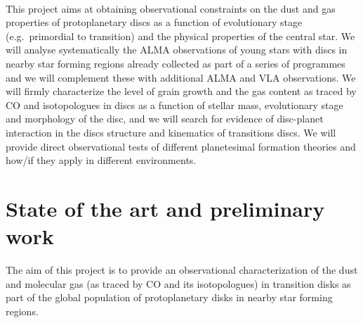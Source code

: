 \documentclass[10pt,fleqn,twoside]{article}
\begin{document}
\vspace{1em}
\\
This project aims at obtaining observational constraints on the dust and gas 
properties of protoplanetary discs as a function of evolutionary stage (e.g.\ primordial to transition) and 
the physical properties of the central star. We will analyse systematically
the ALMA observations of young stars with discs in nearby star forming regions already collected as part of a series of programmes and we will complement these with additional 
ALMA and VLA observations. We will firmly characterize the level of grain growth and the gas content as traced by CO and isotopologues in discs as a function of stellar mass, evolutionary stage and morphology of the disc, and we will search for evidence of disc-planet interaction in the discs structure and kinematics of transitions discs. We will provide direct observational tests of different planetesimal formation theories and how/if they apply in different environments.


\section{State of the art and preliminary work}
\renewcommand{\leftmark}{\sc State of the Art and preliminary work}
\label{s_state_art}

The aim of this project is to provide an observational characterization of the dust and molecular gas
(as traced by CO and its isotopologues) in transition disks as part of the global population of protoplanetary disks in nearby star forming regions.  
\end{document}
